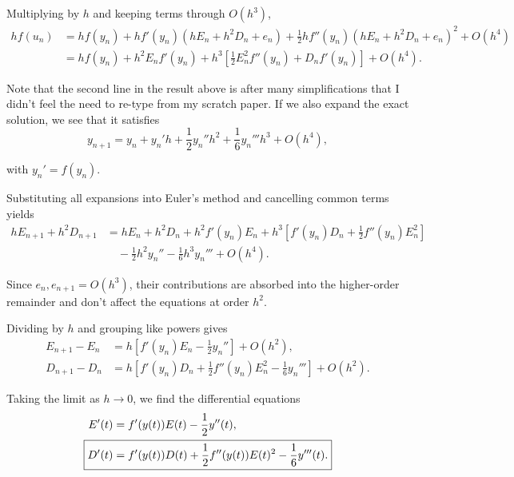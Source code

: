\begin{enumerate}[label=(\alph*)]
      Multiplying by $h$ and keeping terms through $O(h^3)$,
      \begin{align*}
        hf(u_{n}) &= hf(y_{n}) + hf'(y_{n})(hE_{n}+h^{2}D_{n}+e_{n}) + \frac{1}{2}hf''(y_{n})(hE_{n}+h^{2}D_{n}+e_{n})^{2} + O(h^{4}) \\
                  &= hf(y_{n}) + h^{2}E_{n}f'(y_{n}) + h^{3}\left[\frac{1}{2}E_{n}^{2}f''(y_{n}) + D_{n}f'(y_{n})\right] + O(h^{4}).
      \end{align*}

      Note that the second line in the result above is after many simplifications that I didn't feel the need to re-type from my scratch paper. If we also expand the exact solution, we see that it satisfies
      \begin{equation*}
          y_{n+1} = y_{n} + y_{n}'h+\frac{1}{2}y_{n}''h^{2} + \frac{1}{6} y_{n}'''h^{3}+O(h^{4}),
      \end{equation*}

      with $y_n' = f(y_n)$.
      \vspace{1em}

      Substituting all expansions into Euler’s method and cancelling common terms yields
      \begin{align*}
        hE_{n+1} + h^{2}D_{n+1} &= hE_{n} + h^{2}D_{n} + h^{2}f'(y_{n})E_{n} + h^{3} \left[f'(y_{n})D_{n}+\frac{1}{2}f''(y_{n})E_{n}^{2}\right] \\
        &\quad - \frac12 h^2 y_n'' - \frac16 h^3 y_n''' + O(h^4).
      \end{align*}

      Since $e_n, e_{n+1} = O(h^3)$, their contributions are absorbed into the higher-order remainder and don't affect the equations at order $h^2$.
      \vspace{1em}

      Dividing by $h$ and grouping like powers gives
      \begin{align*}
        E_{n+1} - E_n &= h\left[f'(y_n)E_n - \frac12 y_n''\right] + O(h^2), \\
        D_{n+1} - D_n &= h\left[f'(y_n)D_n + \frac12 f''(y_n)E_n^2 - \frac16 y_n'''\right] + O(h^2).
      \end{align*}

      Taking the limit as $h \to 0$, we find the differential equations
      \begin{align*}
        E'(t) &= f'(y(t))E(t) - \frac12 y''(t), \\
        \Aboxed{D'(t) &= f'(y(t))D(t) + \frac12 f''(y(t))E(t)^2 - \frac16 y'''(t).}
      \end{align*}


\end{enumerate}
